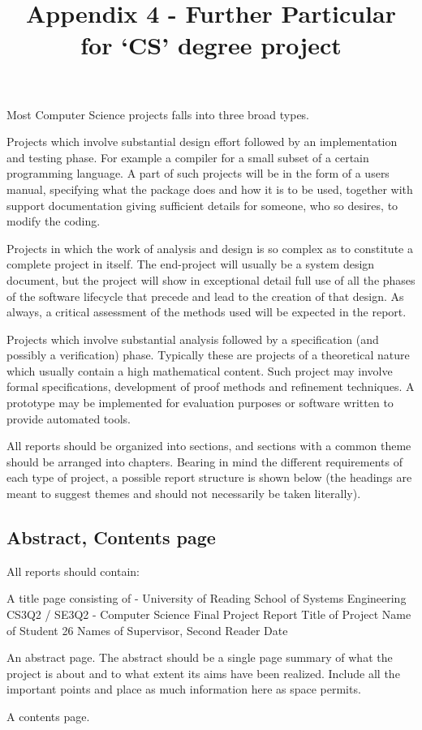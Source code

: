 \documentclass[12]{article}
\begin{document}
\title{Appendix 4 - Further Particular for ‘CS’ degree project}
\maketitle
{}
\section{}
Most Computer Science projects falls into three broad types. 
\begin{list}{Type :~}{\setlength{}}
\item Projects which involve substantial design effort followed by an implementation
and testing phase. For example a compiler for a small subset of a certain programming 
language. A part of such projects will be in the form of a users manual, specifying what 
the package does and how it is to be used, together with support documentation giving 
sufficient details for someone, who so desires, to modify the coding. 
\item Projects in which the work of analysis and design is so complex as to constitute 
a complete project in itself. The end-project will usually be a system design document, 
but the project will show in exceptional detail full use of all the phases of the software 
lifecycle that precede and lead to the creation of  that design. As always, a critical 
assessment of the methods used will be expected in the report. 
\item Projects which involve substantial  analysis followed by a specification (and 
possibly a verification) phase. Typically these are projects of a theoretical nature which 
usually contain a high mathematical content. Such project may involve formal 
specifications, development of proof methods and refinement techniques. A prototype 
may be implemented for evaluation purposes or software written to provide automated 
tools. 
\end{list}
All reports should be organized into sections, and sections with a common theme should be 
arranged into chapters. Bearing in mind the different requirements of  each type of project, a 
possible report structure is shown below (the headings are meant to suggest themes and should 
not necessarily be taken literally). 
\subsection{Abstract, Contents page}
All reports should contain:  
\begin{list}{}{}
\item A title page consisting of - University of Reading 
School of Systems Engineering 
CS3Q2 / SE3Q2 - Computer Science Final Project Report  
Title of Project  
Name of Student  26 
Names of Supervisor, Second Reader 
Date  
\item An abstract page. The abstract should be a single page summary of what the project is about and to 
what extent its aims have been realized. Include all the important points and place as much information 
here as space permits. 
\item A contents page.  
\end{list}
\end{document}
